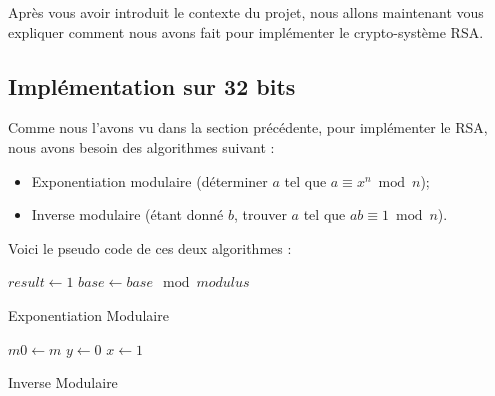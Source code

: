 Après vous avoir introduit le contexte du projet, nous allons maintenant vous expliquer comment nous avons fait pour implémenter le crypto-système RSA.

\subsection{Implémentation sur 32 bits}
Comme nous l'avons vu dans la section précédente, pour implémenter le RSA, nous avons besoin des algorithmes suivant :
\begin{itemize}
	\item Exponentiation modulaire (déterminer $a$ tel que $a \equiv x^n \bmod n$);
	\item Inverse modulaire (étant donné $b$, trouver $a$ tel que $ab \equiv 1 \bmod n$).
\end{itemize}
Voici le pseudo code de ces deux algorithmes :

\begin{algorithm}[H]
\SetAlgoLined
{}
$result \leftarrow 1$\;
$base \leftarrow base \mod modulus$\;
\;
\caption{Exponentiation Modulaire}
\end{algorithm}

\begin{algorithm}[H]
\SetAlgoLined
{}
$m0 \leftarrow m$\;
$y \leftarrow 0$\;
$x \leftarrow 1$\;
\;
\caption{Inverse Modulaire}
\end{algorithm}

